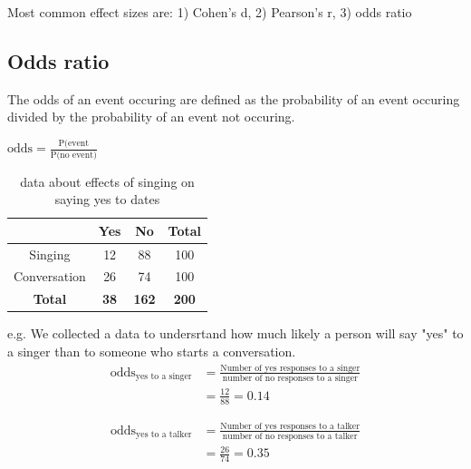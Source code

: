 Most common effect sizes are: 1) Cohen's d, 2) Pearson's r, 3) odds ratio

\subsection{Odds ratio}

The odds of an event occuring are defined as the probability of an event occuring divided by the probability of an event not occuring.

$\text{odds} = \frac{\text{P(event}}{\text{P(no event)}}$ \\

\begin{table}[h]
	\begin{center}
	\setlength\tabcolsep{1cm}
	\begin{tabular}{|c|c|c|c|}
		\hline
		& Yes & No & Total \\
		\hline
		Singing & 12 & 88 & 100\\
		Conversation & 26 & 74 & 100\\
		\textbf{Total} & \textbf{38} & \textbf{162} & \textbf{200}\\
		\hline
	\end{tabular}
	\caption{data about effects of singing on saying yes to dates}
	\end{center}
\end{table}

e.g. We collected a data to undersrtand how much likely a person will say "yes" to a singer than to someone who starts a conversation.\\

\begin{equation*} %
\begin{split}
\text{odds}_{\text{yes to a singer}} & = \frac{\text{Number of yes responses to a singer}}{\text{number of no responses to a singer}} \\ 
&= \frac{12}{88} = 0.14
\end{split}
\end{equation*}

\begin{equation*}
\begin{split}
\text{odds}_{\text{yes to a talker}} & = \frac{\text{Number of yes responses to a talker}}{\text{number of no responses to a talker}} \\ 
&= \frac{26}{74} = 0.35
\end{split}
\end{equation*}


